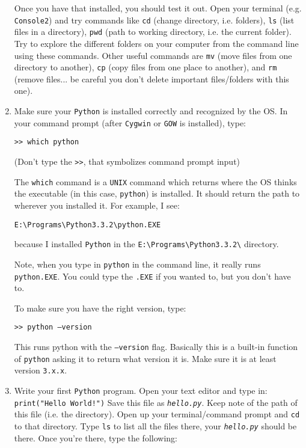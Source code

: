 \documentclass[letterpaper,14pt,oneside]{extarticle}
\begin{document}
\begin{enumerate}[leftmargin=*]
Once you have that installed, you should test it out. Open your terminal (e.g. \texttt{Console2}) and try commands like \texttt{cd} (change directory, i.e. folders), \texttt{ls} (list files in a directory), \texttt{pwd} (path to working directory, i.e. the current folder).  Try to explore the different folders on your computer from the command line using these commands. Other useful commands are \texttt{mv} (move files from one directory to another), \texttt{cp} (copy files from one place to another), and \texttt{rm} (remove files... be careful you don't delete important files/folders with this one).

\item Make sure your \texttt{Python} is installed correctly and recognized by the OS. In your command prompt (after \texttt{Cygwin} or \texttt{GOW} is installed), type:

\texttt{>> which python}

(Don't type the \texttt{>>}, that symbolizes command prompt input)

The \texttt{which} command is a \texttt{UNIX} command which returns where the OS thinks the executable (in this case, \texttt{python}) is installed. It should return the path to wherever you installed it. For example, I see:

\texttt{E:\textbackslash Programs\textbackslash Python3.3.2\textbackslash python.EXE}

because I installed \texttt{Python} in the \texttt{E:\textbackslash Programs\textbackslash Python3.3.2\textbackslash} directory.

Note, when you type in \texttt{python} in the command line, it really runs \texttt{python.EXE}. You could type the \texttt{.EXE} if you wanted to, but you don't have to.

To make sure you have the right version, type:

\texttt{>> python --version}

This runs python with the \texttt{--version} flag. Basically this is a built-in function of \texttt{python} asking it to return what version it is. Make sure it is at least version \texttt{3.x.x}.

\item Write your first \texttt{Python} program. Open your text editor and type in:
\newline\newline
\texttt{print("Hello World!")}
\newline\newline
Save this file as \texttt{\textit{hello.py}}. Keep note of the path of this file (i.e. the directory). Open up your terminal/command prompt and \texttt{cd} to that directory. Type \texttt{ls} to list all the files there, your \texttt{\textit{hello.py}} should be there. Once you're there, type the following:


\end{enumerate}
\end{document}
